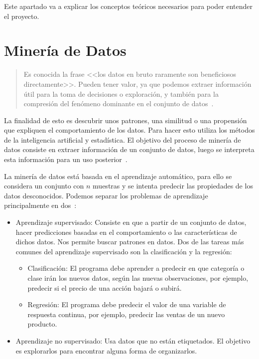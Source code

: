 
Este apartado va a explicar los conceptos teóricos necesarios para poder entender el proyecto.

\section{Minería de Datos}
\begin{quote}
Es conocida la frase <<los datos en bruto raramente son beneficiosos directamente>>. Pueden tener valor, ya que podemos extraer información útil para la toma de decisiones o exploración, y también para la compresión del fenómeno dominante en el conjunto de datos~\cite{mineria}.
\end{quote}

La finalidad de esto es descubrir unos patrones, una similitud o una propensión que expliquen el comportamiento de los datos. Para hacer esto utiliza los métodos de la inteligencia artificial y estadística.
El objetivo del proceso de minería de datos consiste en extraer información de un conjunto de datos, luego se interpreta esta información para un uso posterior~\cite{wiki:datamining}.

La minería de datos está basada en el aprendizaje automático, para ello se considera un conjunto con $n$ muestras y se intenta predecir las propiedades de los datos desconocidos. Podemos separar los problemas de aprendizaje principalmente en dos~\cite{scikitlearn2}:
	\begin{itemize}
		\item Aprendizaje supervisado: Consiste en que a partir de un conjunto de datos, hacer predicciones basadas en el comportamiento o las características de dichos datos. Nos permite buscar patrones en datos. Dos de las tareas más comunes del aprendizaje supervisado son la clasificación y la regresión:
		
		\begin{itemize}
		 	\item Clasificación: El programa debe aprender a predecir en que categoría o clase irán los nuevos datos, según las nuevas observaciones, por ejemplo, predecir si el precio de una acción bajará o subirá.
		 	\item Regresión: El programa debe predecir el valor de una variable de respuesta continua, por ejemplo, predecir las ventas de un nuevo producto.
		\end{itemize}
		
		\item Aprendizaje no supervisado: Usa datos que no están etiquetados. El objetivo es explorarlos para encontrar alguna forma de organizarlos.
	\end{itemize}

